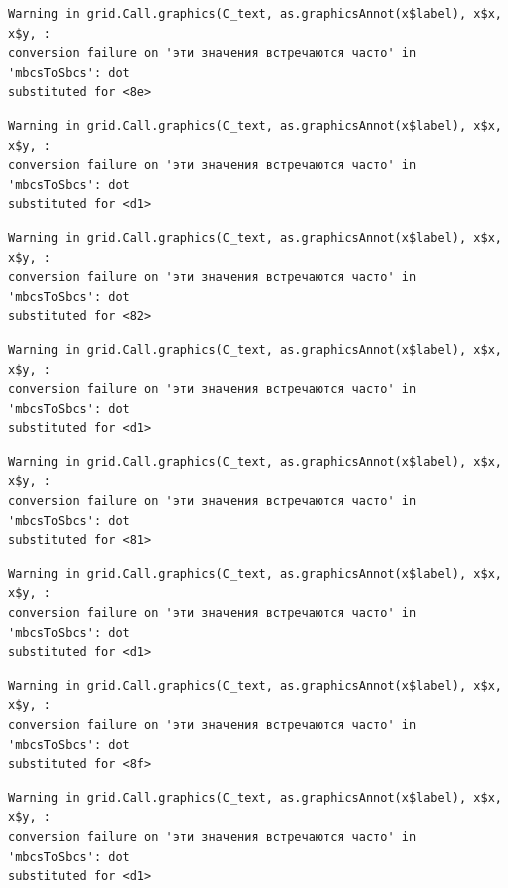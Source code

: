 \documentclass[
  letterpaper,
  DIV=11,
  numbers=noendperiod]{scrreprt}
\theoremstyle{definition}
\theoremstyle{remark}
\begin{document}
\begin{verbatim}
Warning in grid.Call.graphics(C_text, as.graphicsAnnot(x$label), x$x, x$y, :
conversion failure on 'эти значения встречаются часто' in 'mbcsToSbcs': dot
substituted for <8e>
\end{verbatim}

\begin{verbatim}
Warning in grid.Call.graphics(C_text, as.graphicsAnnot(x$label), x$x, x$y, :
conversion failure on 'эти значения встречаются часто' in 'mbcsToSbcs': dot
substituted for <d1>
\end{verbatim}

\begin{verbatim}
Warning in grid.Call.graphics(C_text, as.graphicsAnnot(x$label), x$x, x$y, :
conversion failure on 'эти значения встречаются часто' in 'mbcsToSbcs': dot
substituted for <82>
\end{verbatim}

\begin{verbatim}
Warning in grid.Call.graphics(C_text, as.graphicsAnnot(x$label), x$x, x$y, :
conversion failure on 'эти значения встречаются часто' in 'mbcsToSbcs': dot
substituted for <d1>
\end{verbatim}

\begin{verbatim}
Warning in grid.Call.graphics(C_text, as.graphicsAnnot(x$label), x$x, x$y, :
conversion failure on 'эти значения встречаются часто' in 'mbcsToSbcs': dot
substituted for <81>
\end{verbatim}

\begin{verbatim}
Warning in grid.Call.graphics(C_text, as.graphicsAnnot(x$label), x$x, x$y, :
conversion failure on 'эти значения встречаются часто' in 'mbcsToSbcs': dot
substituted for <d1>
\end{verbatim}

\begin{verbatim}
Warning in grid.Call.graphics(C_text, as.graphicsAnnot(x$label), x$x, x$y, :
conversion failure on 'эти значения встречаются часто' in 'mbcsToSbcs': dot
substituted for <8f>
\end{verbatim}

\begin{verbatim}
Warning in grid.Call.graphics(C_text, as.graphicsAnnot(x$label), x$x, x$y, :
conversion failure on 'эти значения встречаются часто' in 'mbcsToSbcs': dot
substituted for <d1>
\end{verbatim}
\end{document}
